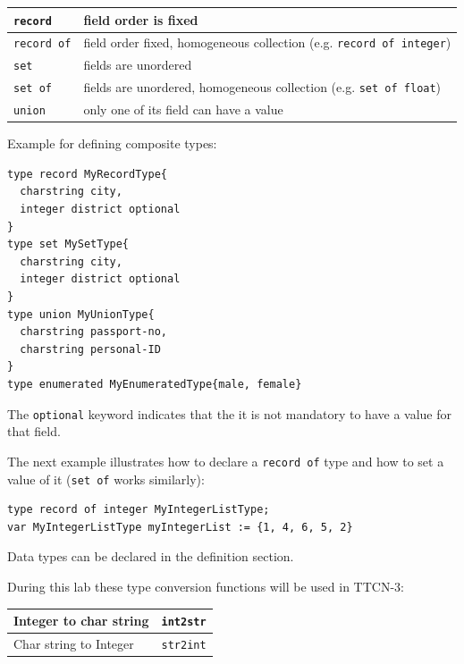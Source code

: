 \documentclass[a4paper]{article}
\begin{document}
{\footnotesize
\begin{center}
    \begin{tabular}{|l|l|}
        \hline
        \verb!record! & field order is fixed                                                              \\
        \hline
        \verb!record of! & field order fixed, homogeneous collection (e.g. \verb!record of integer!)     \\
        \hline
        \verb!set! & fields are unordered                                                              \\
        \hline
        \verb!set of! & fields are unordered, homogeneous collection (e.g. \verb!set of float!)  \\
        \hline
        \verb!union! & only one of its field can have a value                                            \\
        \hline
    \end{tabular}
\end{center}
}

Example for defining composite types:
{\footnotesize
\begin{lstlisting}
type record MyRecordType{
  charstring city,
  integer district optional
}
type set MySetType{
  charstring city,
  integer district optional
}
type union MyUnionType{
  charstring passport-no,
  charstring personal-ID
}
type enumerated MyEnumeratedType{male, female}
\end{lstlisting}
}

The \verb!optional! keyword indicates that the it is not mandatory to have a value for that field.

The next example illustrates how to declare a \verb!record of! type and how to set a value of it
(\verb!set of! works similarly):
{\footnotesize
\begin{lstlisting}
type record of integer MyIntegerListType;
var MyIntegerListType myIntegerList := {1, 4, 6, 5, 2}
\end{lstlisting}
}

Data types can be declared in the definition section.

During this lab these type conversion functions will be used in TTCN-3:

{\footnotesize
\begin{tabular}{|l|l|}
    \hline
    Integer to char string & \verb.int2str.  \\
    \hline
    Char string to Integer & \verb.str2int.  \\
    \hline
\end{tabular}
}
\end{document}
